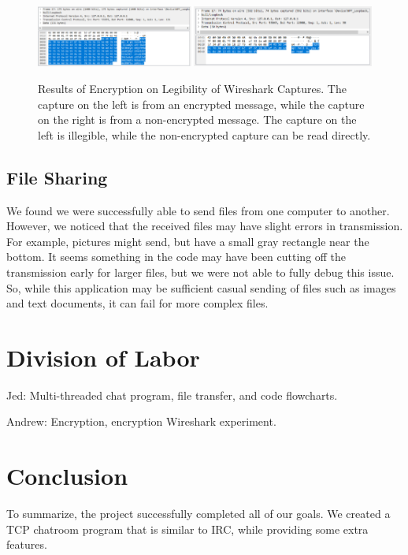 \documentclass{article}
\begin{document}
\begin{figure}[h]
\centering
\includegraphics[width=1\textwidth]{media/WiresharkEncryptionResults.PNG}
\label{Encryption Wireshark Results}
\caption{Results of Encryption on Legibility of Wireshark Captures. The capture on the left is from an encrypted message, while the capture on the right is from a non-encrypted message. The capture on the left is illegible, while the non-encrypted capture can be read directly.}
\end{figure}

\subsection{File Sharing}
We found we were successfully able to send files from one computer to another. However, we noticed that the received files may have slight errors in transmission. For example, pictures might send, but have a small gray rectangle near the bottom. It seems something in the code may have been cutting off the transmission early for larger files, but we were not able to fully debug this issue. So, while this application may be sufficient casual sending of files such as images and text documents, it can fail for more complex files.


\section{Division of Labor}

Jed: Multi-threaded chat program, file transfer, and code flowcharts. 

Andrew: Encryption, encryption Wireshark experiment. 

\section{Conclusion}

To summarize, the project successfully completed all of our goals. We created a TCP chatroom program that is similar to IRC, while providing some extra features. 
\end{document}

